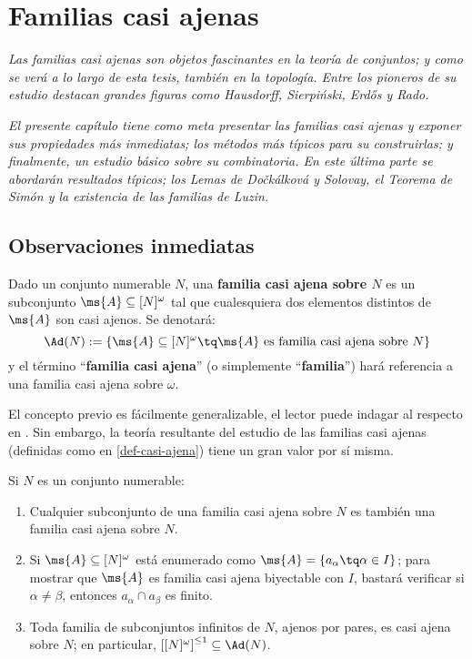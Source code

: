\chapter{Familias casi ajenas}
	\emph{\small Las familias casi ajenas son objetos fascinantes en la teoría de conjuntos; y como se verá a lo largo de esta tesis, también en la topología. Entre los pioneros de su estudio destacan grandes figuras como Hausdorff, Sierpiński, Erdős y Rado.}
	
	\emph{\small El presente capítulo tiene como meta presentar las familias casi ajenas y exponer sus propiedades más inmediatas; los métodos más típicos para su construirlas; y finalmente, un estudio  básico sobre su combinatoria. En este última parte se abordarán resultados típicos; los Lemas de Dočkálková y Solovay, el Teorema de Simón y la existencia de las familias de Luzin.}

	\section{Observaciones inmediatas}

	\begin{definicion}\label{def-casi-ajena}
		Dado un conjunto numerable $N$, una \textbf{familia casi ajena sobre $N$} es un subconjunto $\ms{A}\subseteq[N]^\omega$ tal que cualesquiera dos elementos distintos de $\ms{A}$ son casi ajenos. Se denotará:
		$$ \Ad(N):=\{ \ms{A} \subseteq [N]^\omega \tq \ms{A} \text{ es familia casi ajena sobre } N \} $$
		y el término ``\textbf{familia casi ajena}'' (o simplemente ``\textbf{familia}'') hará referencia a una familia casi ajena sobre $\omega$.
	\end{definicion}

	El concepto previo es fácilmente generalizable, el lector puede indagar al respecto en \cite[Def.~9.20, p.~118]{jechSet}. Sin embargo, la teoría resultante del estudio de las familias casi ajenas (definidas como en \ref{def-casi-ajena}) tiene un gran valor por sí misma.

	\begin{observacion}
		Si $N$ es un conjunto numerable:
		\begin{enumerate}
			\item Cualquier subconjunto de una familia casi ajena sobre $N$ es también una familia casi ajena sobre $N$.
			\item Si $\ms{A} \subseteq [N]^\omega$ está enumerado como $\ms{A} =\{ a_\alpha \tq \alpha \in I \}$; para mostrar que $\ms{A}$ es familia casi ajena biyectable con $I$, bastará verificar si $\alpha \neq \beta$, entonces $a_\alpha \cap a_\beta$ es finito.
			\item Toda familia de subconjuntos infinitos de $N$, ajenos por pares, es casi ajena sobre $N$; en particular, $\left[ [N]^\omega \right]^{\leq 1} \subseteq \Ad(N)$.
		\end{enumerate}
	\end{observacion}
	

